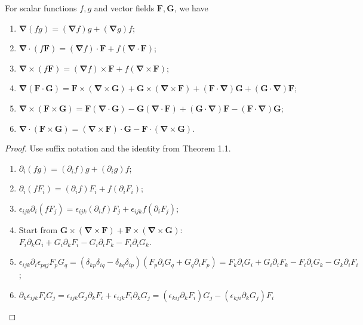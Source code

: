 \documentclass[a4paper]{article}
\begin{document}
\begin{prop}
For scalar functions $f,g$ and vector fields $\mathbf{F},\mathbf{G}$, we have
\begin{enumerate}
    \item $\boldsymbol{\nabla}(fg)=(\boldsymbol{\nabla}f)g+(\boldsymbol{\nabla}g)f$;
    \item $\boldsymbol{\nabla}\cdot(f\mathbf{F})=(\boldsymbol{\nabla}f)\cdot\mathbf{F}+f(\boldsymbol{\nabla}\cdot\mathbf{F})$;
    \item $\boldsymbol{\nabla}\times(f\mathbf{F})=(\boldsymbol{\nabla}f)\times\mathbf{F}+f(\boldsymbol{\nabla}\times\mathbf{F})$;
    \item $\boldsymbol{\nabla}(\mathbf{F}\cdot\mathbf{G})=\mathbf{F}\times(\boldsymbol{\nabla}\times\mathbf{G})+\mathbf{G}\times(\boldsymbol{\nabla}\times\mathbf{F})+(\mathbf{F}\cdot\boldsymbol{\nabla})\mathbf{G}+(\mathbf{G}\cdot\boldsymbol{\nabla})\mathbf{F}$;
    \item $\boldsymbol{\nabla}\times(\mathbf{F}\times\mathbf{G})=\mathbf{F}(\boldsymbol{\nabla}\cdot\mathbf{G})-\mathbf{G}(\boldsymbol{\nabla}\cdot\mathbf{F})+(\mathbf{G}\cdot\boldsymbol{\nabla})\mathbf{F}-(\mathbf{F}\cdot\boldsymbol{\nabla})\mathbf{G}$;
    \item $\boldsymbol{\nabla}\cdot(\mathbf{F}\times\mathbf{G})=(\boldsymbol{\nabla}\times\mathbf{F})\cdot\mathbf{G}-\mathbf{F}\cdot(\boldsymbol{\nabla}\times\mathbf{G})$.
\end{enumerate}
\end{prop}
\begin{proof} Use suffix notation and the identity from Theorem 1.1.
\begin{enumerate}
    \item $\partial_i(fg)=(\partial_if)g+(\partial_ig)f$;
    \item $\partial_i(fF_i)=(\partial_if)F_i+f(\partial_iF_i)$;
    \item $\epsilon_{ijk}\partial_i(fF_j)=\epsilon_{ijk}(\partial_if)F_j+\epsilon_{ijk}f(\partial_iF_j)$;
    \item Start from $\mathbf{G}\times(\boldsymbol{\nabla}\times\mathbf{F})+\mathbf{F}\times(\boldsymbol{\nabla}\times\mathbf{G})$: $F_i\partial_kG_i+G_i\partial_kF_i-G_i\partial_iF_k-F_i\partial_iG_k$.
    \item  $\epsilon_{ijk}\partial_i\epsilon_{pqj}F_pG_q=(\delta_{kp}\delta_{iq}-\delta_{kq}\delta_{ip})(F_p\partial_iG_q+G_q\partial_iF_p)=F_k\partial_iG_i+G_i\partial_iF_k-F_i\partial_iG_k-G_k\partial_iF_i$;
    \item $\partial_k\epsilon_{ijk}F_iG_j=\epsilon_{ijk}G_j\partial_kF_i+\epsilon_{ijk}F_i\partial_kG_j=(\epsilon_{kij}\partial_kF_i)G_j-(\epsilon_{kji}\partial_kG_j)F_i$
\end{enumerate}
\end{proof}
\end{document}
